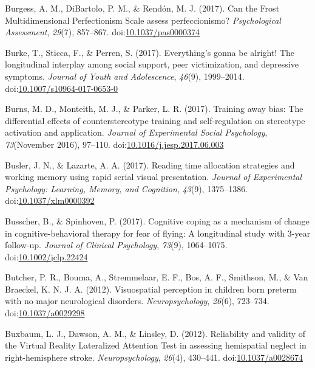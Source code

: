 \documentclass[english,man]{apa6}
\begin{document}
\hypertarget{ref-Burgess2017}{}
Burgess, A. M., DiBartolo, P. M., \& Rendón, M. J. (2017). Can the Frost
Multidimensional Perfectionism Scale assess perfeccionismo?
\emph{Psychological Assessment}, \emph{29}(7), 857--867.
doi:\href{https://doi.org/10.1037/pas0000374}{10.1037/pas0000374}

\hypertarget{ref-Burke2017}{}
Burke, T., Sticca, F., \& Perren, S. (2017). Everything's gonna be
alright! The longitudinal interplay among social support, peer
victimization, and depressive symptoms. \emph{Journal of Youth and
Adolescence}, \emph{46}(9), 1999--2014.
doi:\href{https://doi.org/10.1007/s10964-017-0653-0}{10.1007/s10964-017-0653-0}

\hypertarget{ref-Burns2017}{}
Burns, M. D., Monteith, M. J., \& Parker, L. R. (2017). Training away
bias: The differential effects of counterstereotype training and
self-regulation on stereotype activation and application. \emph{Journal
of Experimental Social Psychology}, \emph{73}(November 2016), 97--110.
doi:\href{https://doi.org/10.1016/j.jesp.2017.06.003}{10.1016/j.jesp.2017.06.003}

\hypertarget{ref-Busler2017}{}
Busler, J. N., \& Lazarte, A. A. (2017). Reading time allocation
strategies and working memory using rapid serial visual presentation.
\emph{Journal of Experimental Psychology: Learning, Memory, and
Cognition}, \emph{43}(9), 1375--1386.
doi:\href{https://doi.org/10.1037/xlm0000392}{10.1037/xlm0000392}

\hypertarget{ref-Busscher2017}{}
Busscher, B., \& Spinhoven, P. (2017). Cognitive coping as a mechanism
of change in cognitive-behavioral therapy for fear of flying: A
longitudinal study with 3-year follow-up. \emph{Journal of Clinical
Psychology}, \emph{73}(9), 1064--1075.
doi:\href{https://doi.org/10.1002/jclp.22424}{10.1002/jclp.22424}

\hypertarget{ref-Butcher2012}{}
Butcher, P. R., Bouma, A., Stremmelaar, E. F., Bos, A. F., Smithson, M.,
\& Van Braeckel, K. N. J. A. (2012). Visuospatial perception in children
born preterm with no major neurological disorders.
\emph{Neuropsychology}, \emph{26}(6), 723--734.
doi:\href{https://doi.org/10.1037/a0029298}{10.1037/a0029298}

\hypertarget{ref-Buxbaum}{}
Buxbaum, L. J., Dawson, A. M., \& Linsley, D. (2012). Reliability and
validity of the Virtual Reality Lateralized Attention Test in assessing
hemispatial neglect in right-hemisphere stroke. \emph{Neuropsychology},
\emph{26}(4), 430--441.
doi:\href{https://doi.org/10.1037/a0028674}{10.1037/a0028674}
\end{document}
